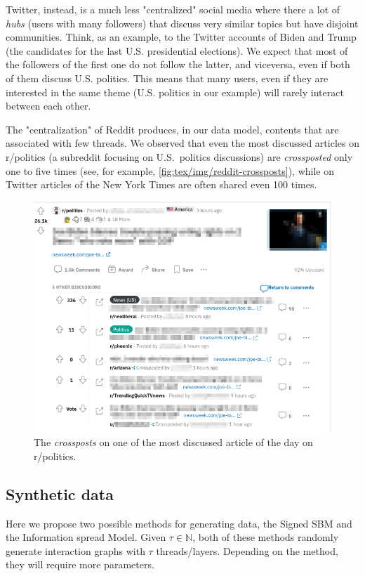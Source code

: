 Twitter, instead, is a much less "centralized" social media where there a lot
of \emph{hubs} (users with many followers) that discuss very similar topics but
have disjoint communities.
Think, as an example, to the Twitter accounts of Biden and Trump (the
candidates for the last U.S. presidential elections). We expect that
most of the followers of the first one do not follow the latter, and
viceversa, even if both of them discuss U.S. politics. This means that many
users, even if they are interested in the same theme (U.S. politics in our example)
will rarely interact between each other.

The "centralization" of Reddit produces, in our data model, contents that are
associated with few threads. We observed that even the most discussed articles
on r/politics (a subreddit focusing on U.S.\ politics discussions) are
\emph{crossposted} only one to five times (see, for example,
\autoref{fig:tex/img/reddit-crossposts}), while on Twitter articles of the New York Times are
often shared even 100 times.

\begin{figure}
	\centering
	\includegraphics[width=0.8\linewidth]{tex/img/reddit-crossposts.png}
	\caption{The \emph{crossposts} on one of the most discussed article of the
		day on r/politics.}%
	\label{fig:tex/img/reddit-crossposts}
\end{figure}

\subsection{Synthetic data}%
\label{sub:synthetic_data}

Here we propose two possible methods for generating data, the Signed SBM and
the Information spread Model. Given $\tau \in \mathbb{N}$, both of these methods randomly generate
interaction graphs with $\tau$ threads/layers.
Depending on the method, they will require more parameters.

